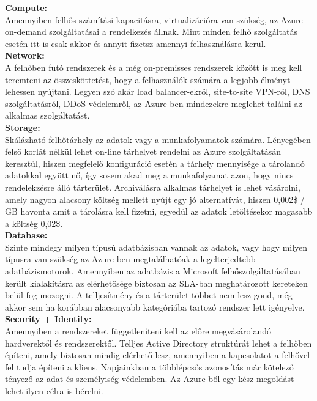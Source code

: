 \documentclass[12pt,oneside,justify,table]{book}
\begin{document}
\noindent \textbf{Compute:}\\
Amennyiben felhős számítási kapacitásra, virtualizációra van szükség, az Azure on-demand szolgáltatásai a rendelkezés állnak. Mint minden felhő szolgáltatás esetén itt is csak akkor és annyit fizetsz amennyi felhasználásra kerül. \\

\noindent \textbf{Network:}\\
A felhőben futó rendszerek és a még on-premisses rendszerek között is meg kell teremteni az összesköttetést, hogy a felhasználók számára a legjobb élményt lehessen nyújtani. Legyen szó akár load balancer-ekről, site-to-site VPN-ről, DNS szolgáltatásról, DDoS védelemről, az Azure-ben mindezekre meglehet találni az alkalmas szolgáltatást.\\

\noindent \textbf{Storage:}\\
Skálázható felhőtárhely az adatok vagy a munkafolyamatok számára. Lényegében felső korlát nélkül lehet on-line tárhelyet rendelni az Azure szolgáltatásán keresztül, hiszen megfelelő konfiguráció esetén a tárhely mennyisége a tárolandó adatokkal együtt nő, így sosem akad meg a munkafolyamat azon, hogy nincs rendelekzésre álló tárterület. Archiválásra alkalmas tárhelyet is lehet vásárolni, amely nagyon alacsony költség mellett nyújt egy jó alternatívát, hiszen 0,002\$ / GB havonta amit a tárolásra kell fizetni, egyedül az adatok letöltésekor magasabb a költség 0,02\$. \\

\noindent \textbf{Database:}\\
Szinte mindegy milyen típusú adatbázisban vannak az adatok, vagy hogy milyen típusra van szükség az Azure-ben megtalálhatóak a legelterjedtebb adatbázismotorok. Amennyiben az adatbázis a Microsoft felhőszolgáltatásában került kialakításra az elérhetősége biztosan az SLA-ban meghatározott kereteken belül fog mozogni. A telljesítmény és a tárterület többet nem lesz gond, még akkor sem ha korábban alacsonyabb kategóriába tartozó rendszer lett igényelve. \\

\noindent \textbf{Security + Identity:}\\
Amennyiben a rendszereket függetleníteni kell az előre megvásárolandó hardverektől és rendszerektől. Telljes Active Directory struktúrát lehet a felhőben építeni, amely biztosan mindig elérhető lesz, amennyiben a kapcsolatot a felhővel fel tudja építeni a kliens. Napjainkban a többlépcsős azonosítás már kötelező tényező az adat és személyiség védelemben. Az Azure-ből egy kész megoldást lehet ilyen célra is bérelni. \\
\end{document}

